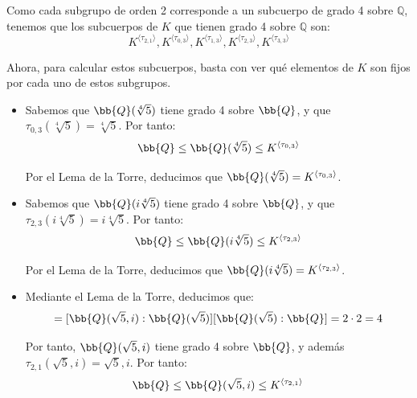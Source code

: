 \begin{ejercicio}
\begin{enumerate}
        Como cada subgrupo de orden 2 corresponde a un subcuerpo de grado 4 sobre $\mathbb{Q}$, tenemos que los subcuerpos de $K$ que tienen grado 4 sobre $\mathbb{Q}$ son:
        \begin{equation*}
            K^{\langle \tau_{2,1} \rangle}, K^{\langle \tau_{0,3} \rangle}, K^{\langle \tau_{1,3} \rangle}, K^{\langle \tau_{2,3} \rangle}, K^{\langle \tau_{3,3} \rangle}
        \end{equation*}

        Ahora, para calcular estos subcuerpos, basta con ver qué elementos de $K$ son fijos por cada uno de estos subgrupos.
        \begin{itemize}
            \item Sabemos que $\bb{Q}(\sqrt[4]{5})$ tiene grado 4 sobre $\bb{Q}$, y que $\tau_{0,3}(\sqrt[4]{5}) = \sqrt[4]{5}$. Por tanto:
            \begin{equation*}
               \bb{Q} \leq \bb{Q}(\sqrt[4]{5}) \leq K^{\langle \tau_{0,3} \rangle}
            \end{equation*}

            Por el Lema de la Torre, deducimos que $\bb{Q}(\sqrt[4]{5}) = K^{\langle \tau_{0,3} \rangle}$.
            \item Sabemos que $\bb{Q}(i\sqrt[4]{5})$ tiene grado 4 sobre $\bb{Q}$, y que $\tau_{2,3}(i\sqrt[4]{5}) = i\sqrt[4]{5}$. Por tanto:
            \begin{equation*}
               \bb{Q} \leq \bb{Q}(i\sqrt[4]{5}) \leq K^{\langle \tau_{2,3} \rangle}
            \end{equation*}

            Por el Lema de la Torre, deducimos que $\bb{Q}(i\sqrt[4]{5}) = K^{\langle \tau_{2,3} \rangle}$.

            \item Mediante el Lema de la Torre, deducimos que:
            \begin{equation*}
                [\bb{Q}(\sqrt{5},i):\bb{Q}] = [\bb{Q}(\sqrt{5},i):\bb{Q}(\sqrt{5})][\bb{Q}(\sqrt{5}):\bb{Q}] = 2\cdot 2 = 4
            \end{equation*}

            Por tanto, $\bb{Q}(\sqrt{5},i)$ tiene grado 4 sobre $\bb{Q}$, y además $\tau_{2,1}(\sqrt{5},i) = \sqrt{5},i$. Por tanto:
            \begin{equation*}
               \bb{Q} \leq \bb{Q}(\sqrt{5},i) \leq K^{\langle \tau_{2,1} \rangle}
            \end{equation*}


\end{itemize}
\end{enumerate}
\end{ejercicio}
